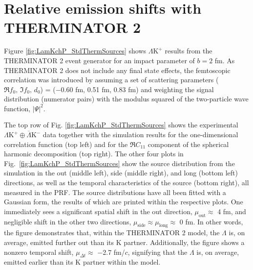 \documentclass[ALICE,manyauthors]{cernphprep}
\newcommand{\Lam}{$\Lambda$\xspace}
\newcommand{\LamKchP}{$\Lambda\mathrm{K^{+}}$\xspace}
\begin{document}
\section{Relative emission shifts with THERMINATOR 2}
\label{App:THERM}

Figure \ref{fig:LamKchP_StdThermSources} shows \LamKchP results from the THERMINATOR 2 event generator for an impact parameter of $b = 2$ fm.
As THERMINATOR 2 does not include any final state effects, the femtoscopic correlation was introduced by assuming a set of scattering parameters ($\Re f_{0},\, \Im f_{0},\, d_{0}$) = ($-$0.60 fm, 0.51 fm, 0.83 fm) and weighting the signal distribution (numerator pairs) with the modulus squared of the two-particle wave function, $|\Psi|^{2}$.

The top row of Fig. \ref{fig:LamKchP_StdThermSources} shows the experimental $\Lambda\mathrm{K}^{+}\oplus\overline{\Lambda}\mathrm{K}^{-}$ data together with the simulation results for the one-dimensional correlation function (top left) and for the $\Re C_{11}$ component of the spherical harmonic decomposition (top right).
The other four plots in Fig.\ \ref{fig:LamKchP_StdThermSources} show the source distribution from the simulation in the out (middle left), side (middle right), and long (bottom left) directions, as well as the temporal characteristics of the source (bottom right), all measured in the PRF.
The source distributions have all been fitted with a Gaussian form, the results of which are printed within the respective plots.
One immediately sees a significant spatial shift in the out direction, $\mu_{\mathrm{out}} \approx$ 4 fm, and negligible shift in the other two directions, $\mu_{\mathrm{side}} \approx \mu_{\mathrm{long}} \approx$ 0 fm.
In other words, the figure demonstrates that, within the THERMINATOR 2 model, the \Lam is, on average, emitted further out than its K partner.
Additionally, the figure shows a nonzero temporal shift, $\mu_{\Delta t} \approx$ $-$2.7 fm/$c$, signifying that the \Lam is, on average, emitted earlier than its K partner within the model. 
\end{document}
